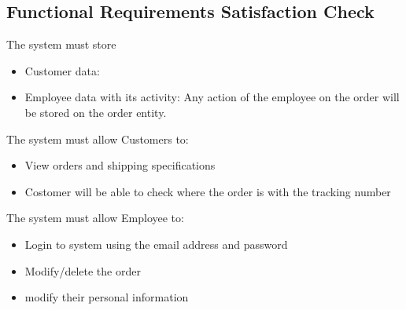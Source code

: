 \subsection{Functional Requirements Satisfaction Check}

The system must store
\begin{itemize}
	\item Customer data:
\end{itemize}
\begin{itemize}
	\item Employee data with its activity:
	Any action of the employee on the order will be stored on the order entity.
\end{itemize}

The system must allow Customers to:
\begin{itemize}
	\item View orders and shipping specifications
	\item Costomer will be able to check where the order is with the tracking number
\end{itemize}

The system must allow Employee to:
\begin{itemize}
	\item Login to system using the email address and password
	\item Modify/delete the order
	\item modify their personal information
\end{itemize}